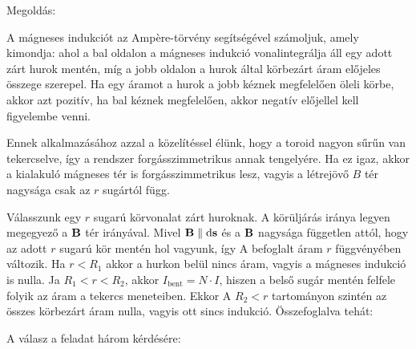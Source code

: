 
\ifdefined\megoldas
  
 Megoldás: 

 A mágneses indukciót az Amp\`ere-törvény segítségével számoljuk, amely kimondja:
 ahol a bal oldalon a mágneses indukció vonalintegrálja áll egy adott zárt hurok mentén, míg a jobb oldalon a hurok által körbezárt áram előjeles összege szerepel. Ha egy áramot a hurok a jobb kéznek megfelelően öleli körbe, akkor azt pozitív, ha bal kéznek megfelelően, akkor negatív előjellel kell figyelembe venni.

 Ennek alkalmazásához azzal a közelítéssel élünk, hogy a toroid nagyon sűrűn van tekercselve, így a rendszer forgásszimmetrikus annak tengelyére. Ha ez igaz, akkor a kialakuló mágneses tér is forgásszimmetrikus lesz, vagyis a létrejövő $B$ tér nagysága csak az $r$ sugártól függ. 

 Válasszunk egy $r$ sugarú körvonalat zárt huroknak. A körüljárás iránya legyen megegyező a $\mathbf{B}$ tér irányával. Mivel $\mathbf{B}\parallel \mathrm{d}\mathbf{s}$ és a $\mathbf{B}$ nagysága független attól, hogy az adott $r$ sugarú kör mentén hol vagyunk, így
 A befoglalt áram $r$ függvényében változik. Ha $r<R_1$ akkor a hurkon belül nincs áram, vagyis a mágneses indukció is nulla. Ja $R_1<r<R_2$, akkor $I_\text{bent} = N\cdot I$, hiszen a belső sugár mentén felfele folyik az áram a tekercs meneteiben. Ekkor
 A $R_2<r$ tartományon szintén az összes körbezárt áram nulla, vagyis ott sincs indukció. Összefoglalva tehát:

 A válasz a feladat három kérdésére:
 
\fi